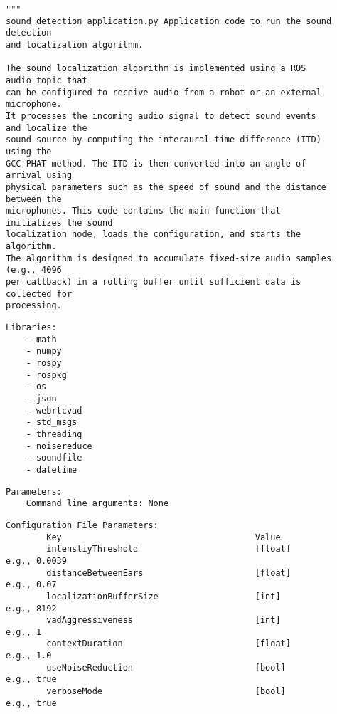 \documentclass{CSSRforAfrica}
\newcommand{\checkboxChecked}{\fbox{\ding{51}}} %
\begin{document}
\begin{description}

\item[\checkboxChecked] 
 {\small 
\begin{verbatim}
"""
sound_detection_application.py Application code to run the sound detection 
and localization algorithm.

The sound localization algorithm is implemented using a ROS audio topic that 
can be configured to receive audio from a robot or an external microphone. 
It processes the incoming audio signal to detect sound events and localize the 
sound source by computing the interaural time difference (ITD) using the 
GCC-PHAT method. The ITD is then converted into an angle of arrival using 
physical parameters such as the speed of sound and the distance between the 
microphones. This code contains the main function that initializes the sound 
localization node, loads the configuration, and starts the algorithm. 
The algorithm is designed to accumulate fixed-size audio samples (e.g., 4096 
per callback) in a rolling buffer until sufficient data is collected for 
processing.
\end{verbatim}}

\item[\checkboxChecked] 
 {\small 
\begin{verbatim}
Libraries:
    - math
    - numpy
    - rospy
    - rospkg
    - os
    - json
    - webrtcvad
    - std_msgs
    - threading
    - noisereduce
    - soundfile
    - datetime
\end{verbatim}}

\item[\checkboxChecked] 
 {\small 
\begin{verbatim}
Parameters:
    Command line arguments: None
\end{verbatim}}

\item[\checkboxChecked] 
 {\small 
\begin{verbatim}
Configuration File Parameters:
        Key                                      Value
        intenstiyThreshold                       [float]     e.g., 0.0039
        distanceBetweenEars                      [float]     e.g., 0.07
        localizationBufferSize                   [int]       e.g., 8192
        vadAggressiveness                        [int]       e.g., 1
        contextDuration                          [float]     e.g., 1.0
        useNoiseReduction                        [bool]      e.g., true
        verboseMode                              [bool]      e.g., true
\end{verbatim}}


\end{description}
\end{document}
